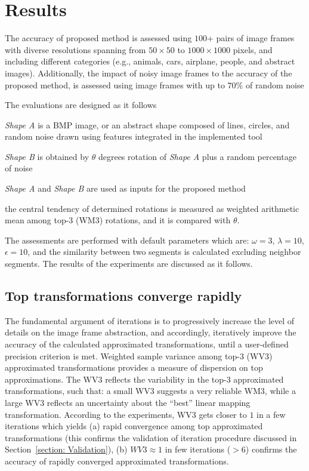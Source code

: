 \section{Results}
The accuracy of proposed method is assessed using $100$+ pairs of image frames with diverse resolutions spanning from $50 \times 50$ to $1000 \times 1000$ pixels, and including different categories (e.g., animals, cars, airplane, people, and abstract images). Additionally, the impact of noisy image frames to the accuracy of the proposed method, is assessed using image frames with up to $70$\% of random noise

The evaluations are designed as it follows
\begin{inlinelist}
	\item \textit{Shape A} is a BMP image, or an abstract shape composed of lines, circles, and random noise drawn using features integrated in the implemented tool
	\item \textit{Shape B} is obtained by $\theta$ degrees rotation of \textit{Shape A} plus a random percentage of noise
	\item \textit{Shape A} and \textit{Shape B} are used as inputs for the proposed method
	\item the central tendency of determined rotations is measured as weighted arithmetic mean among top-3 (WM3) rotations, and it is compared with $\theta$. 
\end{inlinelist}
The assessments are performed with default parameters which are: $\omega = 3$, $\lambda=10$, $\epsilon=10$, and the similarity between two segments is calculated excluding neighbor segments. The results of the experiments are discussed as it follows.

\subsection{Top transformations converge rapidly}
The fundamental argument of iterations is to progressively increase the level of details on the image frame abstraction, and accordingly, iteratively improve the accuracy of the calculated approximated transformations, until a user-defined precision criterion is met. Weighted sample variance among top-3 (WV3) approximated transformations provides a measure of dispersion on top approximations. The WV3 reflects the variability in the top-3 approximated transformations, such that: a small WV3 suggests a very reliable WM3, while a large WV3 reflects an uncertainty about the ``best'' linear mapping transformation. According to the experiments, WV3 gets closer to $1$ in a few iterations which yields (a) rapid convergence among top approximated transformations (this confirms the validation of iteration procedure discussed in Section~\ref{section: Validation}), (b) $\textit{WV3} \approx 1$ in few iterations ($>6$) confirms the accuracy of rapidly converged approximated transformations.


